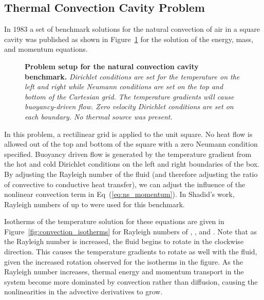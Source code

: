 \subsection{Thermal Convection Cavity Problem}
\label{subsec:natural_convection_cavity}
In 1983 a set of benchmark solutions for the natural convection of air
in a square cavity was published \cite{de_vahl_davis_natural_1983} as
shown in Figure~\ref{fig:natural_convection_cavity} for the solution
of the energy, mass, and momentum equations.

\begin{figure}[t!]
  \begin{center}
    \scalebox{1.5}{
       }
  \end{center}
  \caption{\textbf{Problem setup for the natural convection cavity
      benchmark.} \textit{Dirichlet conditions are set for the
      temperature on the left and right while Neumann conditions are
      set on the top and bottom of the Cartesian grid. The temperature
      gradients will cause buoyancy-driven flow. Zero velocity
      Dirichlet conditions are set on each boundary. No thermal source
      was present.}}
  \label{fig:natural_convection_cavity}
\end{figure}

In this problem, a rectilinear grid is applied to the unit square. No
heat flow is allowed out of the top and bottom of the square with a
zero Neumann condition specified. Buoyancy driven flow is generated by
the temperature gradient from the hot and cold Dirichlet conditions on
the left and right boundaries of the box. By adjusting the Rayleigh
number of the fluid (and therefore adjusting the ratio of convective
to conductive heat transfer), we can adjust the influence of the
nonlinear convection term in Eq~(\ref{eq:ns_momentum}). In Shadid's
work, Rayleigh numbers of up to  were used for this benchmark.

Isotherms of the temperature solution for these equations are given in
Figure~\ref{fig:convection_isotherms} for Rayleigh numbers of
, ,  and . Note that as the
Rayleigh number is increased, the fluid begins to rotate in the
clockwise direction. This causes the temperature gradients to rotate
as well with the fluid, given the increased rotation observed for the
isotherms in the figure. As the Rayleigh number increases, thermal
energy and momentum transport in the system become more dominated by
convection rather than diffusion, causing the nonlinearities in the
advective derivatives to grow.

